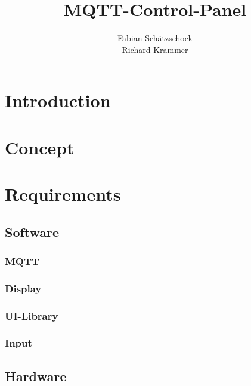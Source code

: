 \documentclass[a4paper]{scrreport}
\title{MQTT-Control-Panel}
\author{Fabian Schätzschock \\ Richard Krammer}
\begin{document}
    
    \maketitle \newpage
    \tableofcontents \newpage

    \chapter{Introduction}      
    \chapter{Concept}
    \chapter{Requirements}
        \section{Software}
            \subsection{MQTT}
            \subsection{Display}
                \subsection{UI-Library}
                \subsection{Input}
        \section{Hardware}
\end{document}
